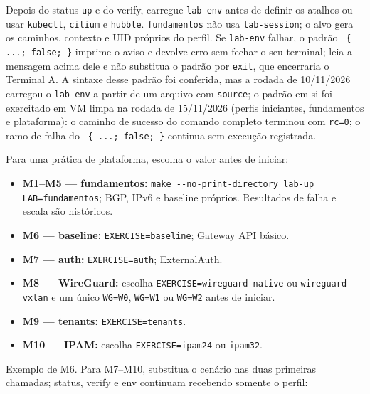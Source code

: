 \documentclass[12pt,openany,oneside,a4paper,chapter=TITLE,english,brazil]{abntex2}
\providecommand{\tightlist}{\setlength{\itemsep}{0pt}\setlength{\parskip}{0pt}}
\begin{document}
Depois do status \texttt{up} e do verify, carregue \texttt{lab-{}\allowbreak{}env} antes de definir os
atalhos ou usar \texttt{kubectl}, \texttt{cilium} e \texttt{hubble}. \texttt{fundamentos} não usa
\texttt{lab-{}\allowbreak{}session}; o alvo gera os caminhos, contexto e UID próprios do perfil. Se
\texttt{lab-{}\allowbreak{}env} falhar, o padrão \texttt{\textbar{}\allowbreak{}\textbar{}\allowbreak{} \{ .\allowbreak{}.\allowbreak{}.\allowbreak{}; false; \}} imprime o aviso e devolve erro
sem fechar o seu terminal; leia a mensagem acima dele e não substitua o padrão
por \texttt{exit}, que encerraria o Terminal A. A sintaxe desse padrão foi conferida,
mas a rodada de 10/11/2026 carregou o \texttt{lab-{}\allowbreak{}env} a partir de um arquivo com
\texttt{source}; o padrão em si foi exercitado em VM limpa na rodada de 15/11/2026
(perfis iniciantes, fundamentos e plataforma): o caminho de sucesso do comando
completo terminou com \texttt{rc=\allowbreak{}0}; o ramo de falha do \texttt{\textbar{}\allowbreak{}\textbar{}\allowbreak{} \{ .\allowbreak{}.\allowbreak{}.\allowbreak{}; false; \}} continua
sem execução registrada.

Para uma prática de plataforma, escolha o valor antes de iniciar:

\begin{itemize}
\tightlist
\item
  \textbf{M1--M5 --- fundamentos:} \texttt{make -{}\allowbreak{}-{}\allowbreak{}no-{}\allowbreak{}print-{}\allowbreak{}directory lab-{}\allowbreak{}up LAB=\allowbreak{}fundamentos}; BGP, IPv6 e baseline próprios. Resultados de falha e escala são históricos.
\item
  \textbf{M6 --- baseline:} \texttt{EXERCISE=\allowbreak{}baseline}; Gateway API básico.
\item
  \textbf{M7 --- auth:} \texttt{EXERCISE=\allowbreak{}auth}; ExternalAuth.
\item
  \textbf{M8 --- WireGuard:} escolha \texttt{EXERCISE=\allowbreak{}wireguard-{}\allowbreak{}native} ou \texttt{wireguard-{}\allowbreak{}vxlan} e um único \texttt{WG=\allowbreak{}W0}, \texttt{WG=\allowbreak{}W1} ou \texttt{WG=\allowbreak{}W2} antes de iniciar.
\item
  \textbf{M9 --- tenants:} \texttt{EXERCISE=\allowbreak{}tenants}.
\item
  \textbf{M10 --- IPAM:} escolha \texttt{EXERCISE=\allowbreak{}ipam24} ou \texttt{ipam32}.
\end{itemize}

Exemplo de M6. Para M7--M10, substitua o cenário nas duas primeiras chamadas;
status, verify e env continuam recebendo somente o perfil:
\end{document}
